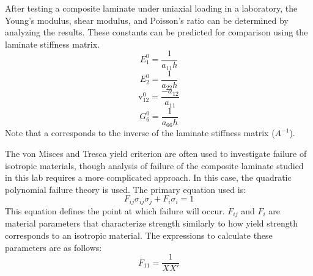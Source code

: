 After testing a composite laminate under uniaxial loading in a laboratory, the Young's modulus, shear modulus, and Poisson's ratio can be determined by analyzing the results. These constants can be predicted for comparison using the laminate stiffness matrix.
\begin{equation}
    E_1^0  = \frac{1}{a_{11}h}
\end{equation}
\begin{equation}
    E_2^0  = \frac{1}{a_{22}h}
\end{equation}
\begin{equation}
    \mbox{v}_{12}^0 = \frac{-a_{12}}{a_{11}}
\end{equation}
\begin{equation}
    G_6^0  = \frac{1}{a_{66}h}
\end{equation}
Note that a corresponds to the inverse of the laminate stiffness matrix ($A^{-1}$). 

The von Misces and Tresca yield criterion are often used to investigate failure of isotropic materials, though analysis of failure of the composite laminate studied in this lab requires a more complicated approach. In this case, the quadratic polynomial failure theory is used. The primary equation used is:
\begin{equation}
    F_{ij} \sigma_{ij} \sigma_j + F_i \sigma_i = 1
\end{equation}
This equation defines the point at which failure will occur. $F_{ij}$ and $F_i$ are material parameters that characterize strength similarly to how yield strength corresponds to an isotropic material. The expressions to calculate these parameters are as follows:
\begin{equation}
    \overline{F}_{11} = \frac{1}{XX'}
\end{equation}
